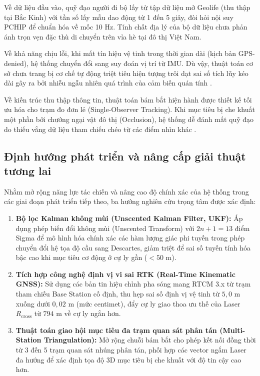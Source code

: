 Về dữ liệu đầu vào, quỹ đạo người đi bộ lấy từ tập dữ liệu mở Geolife \cite{zheng2008geolife} (thu thập tại Bắc Kinh) với tần số lấy mẫu dao động từ 1 đến 5 giây, đòi hỏi nội suy PCHIP \cite{fritsch1980monotone} để chuẩn hóa về mốc 10 Hz. Tính chất địa lý của bộ dữ liệu chưa phản ánh trọn vẹn đặc thù di chuyển trên vỉa hè tại đô thị Việt Nam.

Về khả năng chịu lỗi, khi mất tín hiệu vệ tinh trong thời gian dài (kịch bản GPS-denied), hệ thống chuyển đổi sang suy đoán vị trí từ IMU. Dù vậy, thuật toán cơ sở chưa trang bị cơ chế tự động triệt tiêu hiện tượng trôi dạt sai số tích lũy kéo dài gây ra bởi nhiễu ngẫu nhiên quá trình của cảm biến quán tính \cite{groves2013principles}.

Về kiến trúc thu thập thông tin, thuật toán bám bắt hiện hành được thiết kế tối ưu hóa cho trạm đo đơn lẻ (Single-Observer Tracking). Khi mục tiêu bị che khuất một phần bởi chướng ngại vật đô thị (Occlusion), hệ thống dễ đánh mất quỹ đạo do thiếu vắng dữ liệu tham chiếu chéo từ các điểm nhìn khác \cite{li2003survey}.

\subsection{Định hướng phát triển và nâng cấp giải thuật tương lai}

\hspace{0.5cm} Nhằm mở rộng năng lực tác chiến và nâng cao độ chính xác của hệ thống trong các giai đoạn phát triển tiếp theo, ba hướng nghiên cứu trọng tâm được xác định:
\begin{enumerate}
    \item \textbf{Bộ lọc Kalman không mùi (Unscented Kalman Filter, UKF):} Áp dụng phép biến đổi không mùi (Unscented Transform) với $2n+1 = 13$ điểm Sigma để mô hình hóa chính xác các hàm lượng giác phi tuyến trong phép chuyển đổi hệ tọa độ cầu sang Descartes, giảm triệt để sai số tuyến tính hóa bậc cao khi mục tiêu cơ động ở cự ly gần ($< 50$ m).
    \item \textbf{Tích hợp công nghệ định vị vi sai RTK (Real-Time Kinematic GNSS):} Sử dụng các bản tin hiệu chỉnh pha sóng mang RTCM 3.x từ trạm tham chiếu Base Station cố định, thu hẹp sai số định vị vệ tinh từ $5{,}0$ m xuống dưới $0{,}02$ m (mức centimet), đẩy cự ly giao thoa ưu thế của Laser $R_{\text{cross}}$ từ $794$ m về cự ly ngắn hơn.
    \item \textbf{Thuật toán giao hội mục tiêu đa trạm quan sát phân tán (Multi-Station Triangulation):} Mở rộng chuỗi bám bắt cho phép kết nối đồng thời từ 3 đến 5 trạm quan sát nhúng phân tán, phối hợp các vector ngắm Laser đa hướng để xác định tọa độ 3D mục tiêu bị che khuất với độ tin cậy cao hơn.
\end{enumerate}

